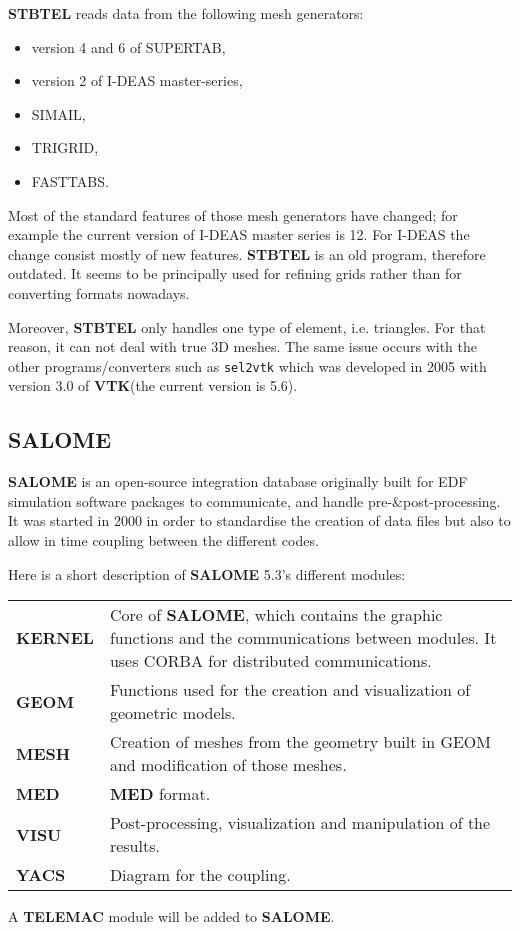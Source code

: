 \documentclass[a4paper,10pt]{article}
\newcommand{\tel}{\textbf{TELEMAC}\xspace}
\newcommand{\stb}{\textbf{STBTEL}\xspace}
\newcommand{\sal}{\textbf{SALOME}\xspace}
\newcommand{\med}{\textbf{MED}\xspace}
\newcommand{\vtk}{\textbf{VTK}\xspace}
\begin{document}
\stb reads data from the following mesh generators:

\begin{itemize}
\setlength{\itemsep}{1pt}
\setlength{\parskip}{0pt}
\setlength{\parsep}{0pt}
\item version 4 and 6 of SUPERTAB,
\item version 2 of I-DEAS master-series,
\item SIMAIL,
\item TRIGRID,
\item FASTTABS.
\end{itemize}

Most of the standard features of those mesh generators have changed; for
example the current version of I-DEAS master series is 12. For I-DEAS the
change consist mostly of new features.  \stb is an old program, therefore
outdated. It seems to be principally used for refining grids rather than for
converting formats nowadays. 

Moreover, \stb only handles one type of element, i.e. triangles. For that
reason, it can not deal with true 3D meshes.  The same issue occurs with the
other programs/converters such as \verb+sel2vtk+ which was developed in 2005
with version 3.0 of \vtk (the current version is 5.6).

\subsection{\sal\cite{salome}}
\sal is an open-source integration database originally built for EDF simulation
software packages to communicate, and handle pre-\&post-processing. It was
started in 2000 in order to standardise the creation of data files but also to
allow in time coupling between the different codes.

Here is a short description of \sal 5.3's different modules:\\

\begin{tabular}{p{70pt}@{ : }p{250pt}}
  \textbf{KERNEL} & Core of \sal, which contains the graphic functions and the
communications between modules. It uses CORBA for distributed communications.\\
  \textbf{GEOM} & Functions used for the creation and visualization of
geometric models.\\
  \textbf{MESH} & Creation of meshes from the geometry built in GEOM and
modification of those meshes.\\
  \textbf{MED} & \med format.\\
  \textbf{VISU} & Post-processing, visualization and manipulation of the
results.\\
  \textbf{YACS} & Diagram for the coupling.\\
\end{tabular}
A \tel module will be added to \sal.
\end{document}
